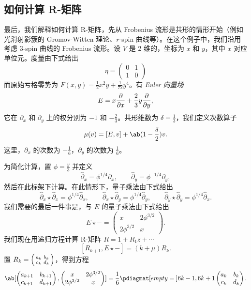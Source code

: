 \documentclass{amsart}
\theoremstyle{definition}
\theoremstyle{remark}
\theoremstyle{plain}
\theoremstyle{definition}
\theoremstyle{remark}
\newcommand{\1}{\mathbf{1}}
\newcommand{\2}{\mathbf{2}}
\newcommand{\3}{\mathbf{3}}
\begin{document}
\subsection{如何计算 R-矩阵}%
\label{sub:How to compute the R-matrix}

最后，我们解释如何计算 R-矩阵，先从 Frobenius 流形是共形的情形开始（例如光滑射影簇的 Gromov-Witten 理论、\(r\)-spin 曲线等）。在这个例子中，我们沿用~\cite{PPZ2015} 考虑 3-spin 曲线的 Frobenius 流形。设 \(V\) 是 2 维的，坐标为 \(x\) 和 \(y\)，其中 \(x\) 对应单位元。度量由下式给出
\[ \eta = \begin{pmatrix}
    0 & 1 \\
    1 & 0
\end{pmatrix} \]
而原始亏格零势为 \(F(x,y) = \frac{1}{2} x^2 y + \frac{1}{72} y^4\)。有 \textit{Euler 向量场}
\[ E = x \pdv{}{x} + \frac{2}{3} y \pdv{}{y}, \]
它在 \(\partial_x\) 和 \(\partial_y\) 上的权分别为 \(-1\) 和 \(-\frac{2}{3}\)。共形维数为 \(\delta = \frac{1}{3}\)，我们定义次数算子
\[ \mu(v) = [E,v] + \ab(1 - \frac{\delta}{2})v. \]
这里，\(\partial_x\) 的次数为 \(-\frac{1}{6}\)，\(\partial_y\) 的次数为 \(\frac{1}{6}\)。

为简化计算，置 \(\phi = \frac{y}{3}\) 并定义
\[ \hat{\partial}_x = \phi^{1/4} \partial_x, \qquad \hat{\partial}_y = \phi^{-1/4} \partial_y, \]
然后在此标架下计算。在此情形下，量子乘法由下式给出
\[ \hat{\partial}_x \star \hat{\partial}_x = \phi^{1/4} \hat{\partial}_x, \qquad \hat{\partial}_x \star \hat{\partial}_y = \phi^{1/4} \hat{\partial}_y, \qquad \hat{\partial}_y \star \hat{\partial}_y = \phi^{1/4} \hat{\partial}_x. \]
我们需要的最后一件事是，与 \(E\) 的量子乘法由下式给出
\[ E \star - = \begin{pmatrix}
    x & 2 \phi^{3/2} \\
    2 \phi^{3/2} & x 
\end{pmatrix}. \]
我们现在用递归方程计算 R-矩阵 \(R = 1 + R_1 z + \cdots\)
\[ [R_{k+1}, E \star -] = (k + \mu) R_k. \]
置 \(R_k = \begin{psmallmatrix}
    a_k & b_k \\
    c_k & d_k
\end{psmallmatrix}\)，得到方程
\[ \ab[
    \begin{pmatrix}
        a_{k+1} & b_{k+1} \\
        c_{k+1} & d_{k+1}
    \end{pmatrix}, \begin{pmatrix}
        x & 2 \phi^{3/2} \\
        2 \phi^{3/2} & x 
    \end{pmatrix}
] = \frac{1}{6} \pdiagmat[empty={}]{6k-1, 6k+1} \begin{pmatrix}
    a_k & b_k \\
    c_k & d_k 
\end{pmatrix}. \]
\end{document}
